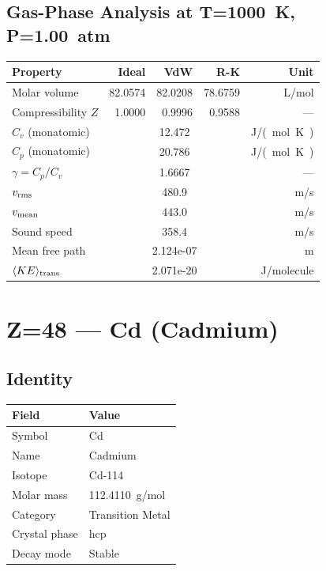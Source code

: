 \documentclass[11pt,a4paper]{article}
\begin{document}
\subsection{Gas-Phase Analysis at T=\SI{1000}{K}, P=\SI{1.00}{atm}}
\begin{tabular}{lrrrr}
  \toprule
  Property & Ideal & VdW & R-K & Unit \\
  \midrule
  Molar volume & 82.0574 & 82.0208 & 78.6759 & \si{L/mol} \\
  Compressibility $Z$ & 1.0000 & 0.9996 & 0.9588 & --- \\
  \midrule
  $C_v$ (monatomic) & \multicolumn{3}{c}{12.472} & \si{J/(mol.K)} \\
  $C_p$ (monatomic) & \multicolumn{3}{c}{20.786} & \si{J/(mol.K)} \\
  $\gamma = C_p/C_v$ & \multicolumn{3}{c}{1.6667} & --- \\
  $v_{\rm rms}$ & \multicolumn{3}{c}{480.9} & \si{m/s} \\
  $v_{\rm mean}$ & \multicolumn{3}{c}{443.0} & \si{m/s} \\
  Sound speed & \multicolumn{3}{c}{358.4} & \si{m/s} \\
  Mean free path & \multicolumn{3}{c}{2.124e-07} & \si{m} \\
  $\langle KE \rangle_{\rm trans}$ & \multicolumn{3}{c}{2.071e-20} & \si{J/molecule} \\
  \bottomrule
\end{tabular}

\newpage

\section{Z=48 --- Cd (Cadmium)}
\label{sec:Z48}

\subsection{Identity}
\begin{tabular}{ll}
  \toprule
  Field & Value \\
  \midrule
  Symbol & Cd \\
  Name & Cadmium \\
  Isotope & Cd-114 \\
  Molar mass & \SI{112.4110}{g/mol} \\
  Category & Transition Metal \\
  Crystal phase & hcp \\
  Decay mode & Stable \\
  \bottomrule
\end{tabular}
\end{document}
